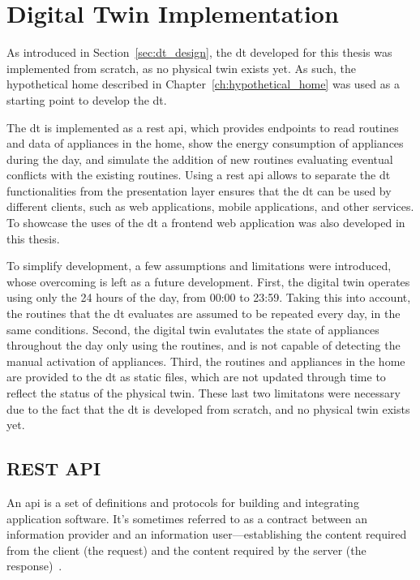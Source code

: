 \chapter{Digital Twin Implementation}\label{ch:implementation}

As introduced in Section~\ref{sec:dt_design}, the \acrshort{dt} developed for this thesis was implemented from scratch, as no physical twin exists yet. As such, the hypothetical home described in Chapter~\ref{ch:hypothetical_home} was used as a starting point to develop the \acrshort{dt}.

The \acrshort{dt} is implemented as a \acrfull{rest} \acrfull{api}, which provides endpoints to read routines and data of appliances in the home, show the energy consumption of appliances during the day, and simulate the addition of new routines evaluating eventual conflicts with the existing routines. Using a \acrshort{rest} \acrshort{api} allows to separate the \acrshort{dt} functionalities from the presentation layer ensures that the \acrshort{dt} can be used by different clients, such as web applications, mobile applications, and other services. To showcase the uses of the \acrshort{dt} a frontend web application was also developed in this thesis.

To simplify development, a few assumptions and limitations were introduced, whose overcoming is left as a future development. First, the digital twin operates using only the 24 hours of the day, from 00:00 to 23:59. Taking this into account, the routines that the \acrshort{dt} evaluates are assumed to be repeated every day, in the same conditions. Second, the digital twin evalutates the state of appliances throughout the day only using the routines, and is not capable of detecting the manual activation of appliances. Third, the routines and appliances in the home are provided to the \acrshort{dt} as static files, which are not updated through time to reflect the status of the physical twin. These last two limitatons were necessary due to the fact that the \acrshort{dt} is developed from scratch, and no physical twin exists yet.

\section{REST API}

An \acrshort{api} is a set of definitions and protocols for building and integrating application software. It's sometimes referred to as a contract between an information provider and an information user—establishing the content required from the client (the request) and the content required by the server (the response)~\parencite{redhatinc.WhatRESTAPI2020}.

